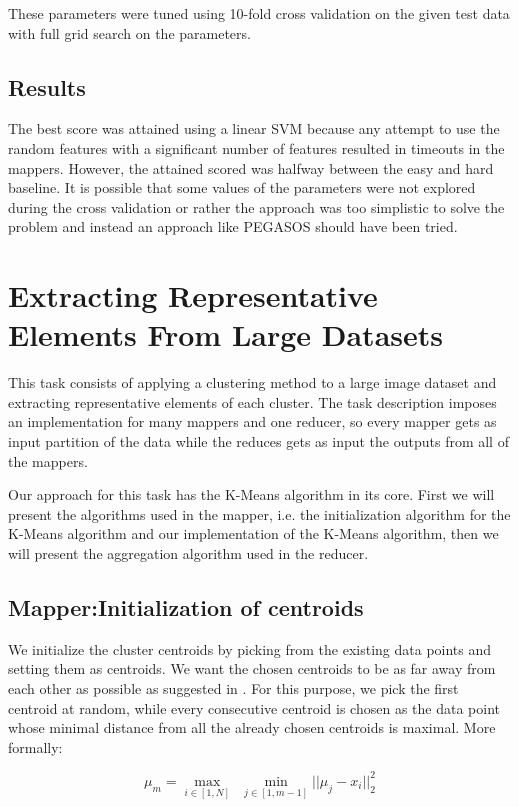 \documentclass[a4paper, 11pt]{article}
\begin{document}
These parameters were tuned using 10-fold cross validation on the given test data with full grid search on the parameters.

\subsection{Results}

The best score was attained using a linear SVM because any attempt to use the random features with a significant number of features resulted in timeouts in the mappers. However, the attained scored was halfway between the easy and hard baseline. It is possible that some values of the parameters were not explored during the cross validation or rather the approach was too simplistic to solve the problem and instead an approach like PEGASOS should have been tried.

\clearpage
\section{Extracting Representative Elements From Large Datasets}
This task consists of applying a clustering method to a large image dataset and extracting representative elements of each cluster. The task description imposes an implementation for many mappers and one reducer, so every mapper gets as input partition of the data while the reduces gets as input the outputs from all of the mappers.

Our approach for this task has the K-Means algorithm in its core. First we will present the algorithms used in the mapper, i.e. the initialization algorithm for the K-Means algorithm and our implementation of the K-Means algorithm, then we will present the aggregation algorithm used in the reducer. 

\subsection{Mapper:Initialization of centroids}

We initialize the cluster centroids by picking from the existing data points and setting them as centroids. We want the chosen centroids to be as far away from each other as possible as suggested in \cite{ullman}. For this purpose, we pick the first centroid at random, while every consecutive centroid is chosen as the data point whose minimal distance from all the already chosen centroids is maximal. More formally:

$$\mu_m = \max\limits_{i \in [1,N]} \ \   \min\limits_{j \in [1,m-1]} ||\mu_j-x_i||_2^2$$
\end{document}
